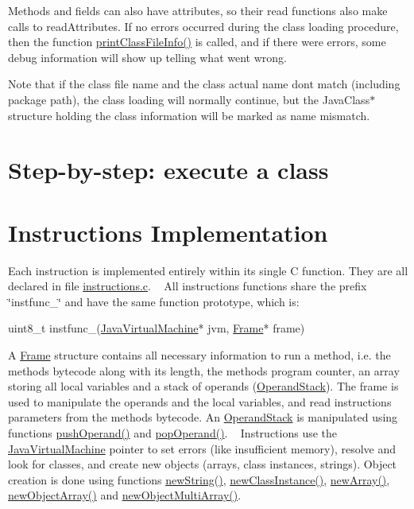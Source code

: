 Methods and fields can also have attributes, so their read functions also make calls to read\+Attributes. If no errors occurred during the class loading procedure, then the function \hyperlink{javaclass_8h_a90175fdf9e50aea1c9db6dee3f828e49}{print\+Class\+File\+Info()} is called, and if there were errors, some debug information will show up telling what went wrong.

Note that if the class file name and the class actual name don\textquotesingle{}t match (including package path), the class loading will normally continue, but the Java\+Class$\ast$ structure holding the class information will be marked as name mismatch.\hypertarget{index_stepguideJVM}{}\section{Step-\/by-\/step\+: execute a class}\label{index_stepguideJVM}
\hypertarget{index_instructions}{}\section{Instructions Implementation}\label{index_instructions}
Each instruction is implemented entirely within its single C function. They are all declared in file \hyperlink{instructions_8c}{instructions.\+c}. ~\newline
 All instructions functions share the prefix \char`\"{}instfunc\+\_\+\char`\"{} and have the same function prototype, which is\+: 
\begin{DoxyCode}
uint8\_t instfunc\_<instruction name>(\hyperlink{structJavaVirtualMachine}{JavaVirtualMachine}* jvm, 
      \hyperlink{structFrame}{Frame}* frame)
\end{DoxyCode}
 A \hyperlink{structFrame}{Frame} structure contains all necessary information to run a method, i.\+e. the method\textquotesingle{}s bytecode along with its length, the method\textquotesingle{}s program counter, an array storing all local variables and a stack of operands (\hyperlink{structOperandStack}{Operand\+Stack}). The frame is used to manipulate the operands and the local variables, and read instructions parameters from the method\textquotesingle{}s bytecode. An \hyperlink{structOperandStack}{Operand\+Stack} is manipulated using functions \hyperlink{operandstack_8c_a303eeaf9017d19267a875dd251fa2857}{push\+Operand()} and \hyperlink{operandstack_8c_a5ba14f5f382f622f8c50f17aed6e3805}{pop\+Operand()}. ~\newline
 Instructions use the \hyperlink{structJavaVirtualMachine}{Java\+Virtual\+Machine} pointer to set errors (like insufficient memory), resolve and look for classes, and create new objects (arrays, class instances, strings). Object creation is done using functions \hyperlink{jvm_8c_a8a0f79bec7b4a76d2ca09ab27342f639}{new\+String()}, \hyperlink{jvm_8c_a8bbe91a3e26f98b22758016825b6cdd1}{new\+Class\+Instance()}, \hyperlink{jvm_8c_a718c81a95f3f6222a97b8e8b6980bdcb}{new\+Array()}, \hyperlink{jvm_8c_a03c8cda9f6251e682f2b46262b7a672d}{new\+Object\+Array()} and \hyperlink{jvm_8c_ae92de2ed6014d3c92ec9ea84a3bd4179}{new\+Object\+Multi\+Array()}. ~\newline
